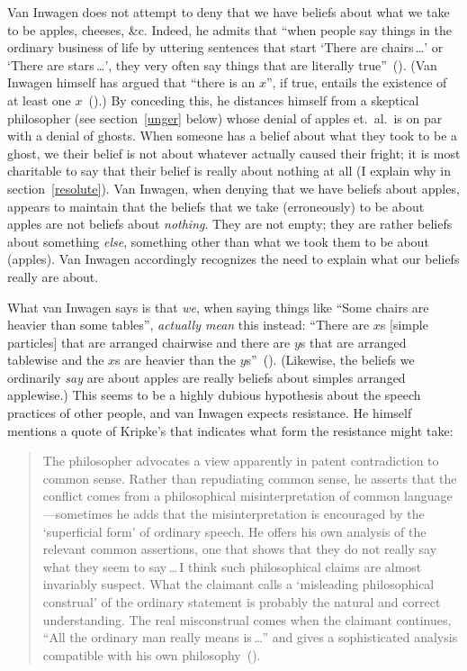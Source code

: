 \documentclass[11pt]{article}
\newenvironment{squote}{\begin{quote}\begin{singlespace}}{\end{singlespace}\end{quote}}
\begin{document}
\begin{spacing}{1.5}
Van Inwagen does not attempt to deny that we have beliefs about what we take to be apples, cheeses, \&c. Indeed, he admits that ``when people say things in the ordinary business of life by uttering sentences that start `There are chairs\,\ldots ' or `There are stars\,\ldots ', they very often say things that are literally true''~(\citeyear[102]{inwagen1995}). (Van Inwagen himself has argued that ``there is an $x$'', if true, entails the existence of at least one $x$~(\citeyear[237--241]{inwagen1998}).) By conceding this, he distances himself from a skeptical philosopher (see section~\ref{unger} below) whose denial of apples et.\ al.\ is on par with a denial of ghosts. When someone has a belief about what they took to be a ghost, we their belief is not about whatever actually caused their fright; it is most charitable to say that their belief is really about nothing at all (I explain why in section~\ref{resolute}). Van Inwagen, when denying that we have beliefs about apples, appears to maintain that the beliefs that we take (erroneously) to be about apples are not beliefs about {\em nothing}. They are not empty; they are rather beliefs about something {\em else}, something other than what we took them to be about (apples). Van Inwagen accordingly recognizes the need to explain what our beliefs really are about.

What van Inwagen says is that {\em we}, when saying things like ``Some chairs are heavier than some tables'', {\em actually mean} this instead: ``There are $x$s [simple particles] that are arranged chairwise and there are $y$s that are arranged tablewise and the $x$s are heavier than the $y$s''~(\citeyear[109]{inwagen1995}). (Likewise, the beliefs we ordinarily {\em say} are about apples are really beliefs about simples arranged applewise.) This seems to be a highly dubious hypothesis about the speech practices of other people, and van Inwagen expects resistance. He himself mentions a quote of Kripke's that indicates what form the resistance might take:
\begin{squote}
The philosopher advocates a view apparently in patent contradiction to common sense. Rather than repudiating common sense, he asserts that the conflict comes from a philosophical misinterpretation of common language---sometimes he adds that the misinterpretation is encouraged  by the `superficial form' of ordinary speech. He offers his own analysis of the relevant common assertions, one that shows that they do not really say what they seem to say\,\ldots\,I think such philosophical claims are almost invariably suspect. What the claimant calls a `misleading philosophical construal' of the ordinary statement is probably the natural and correct understanding. The real misconstrual comes when the claimant continues, ``All the ordinary man really means is\,\ldots '' and gives a sophisticated analysis compatible with his own philosophy~(\citeyear[65]{kripke1982}).
\end{squote}


\end{spacing}
\end{document}
